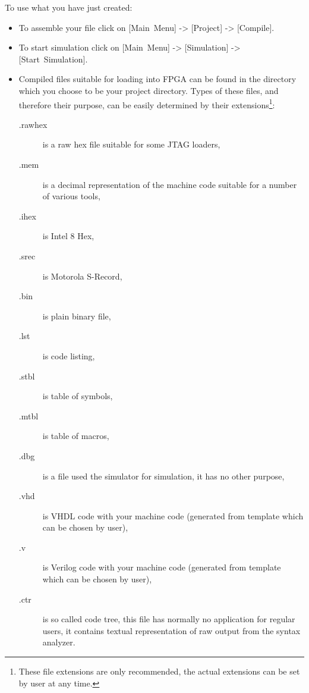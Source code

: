     To use what you have just created:
    \begin{itemize}
        \item To assemble your file click on [Main~Menu] -> [Project] -> [Compile].
        \item To start simulation click on [Main~Menu] -> [Simulation] -> [Start~Simulation].
        \item Compiled files suitable for loading into FPGA can be found in the directory which you choose to be your
              project directory. Types of these files, and therefore their purpose, can be easily determined by their
              extensions\footnote{These file extensions are only recommended, the actual extensions can be set by user
              at any time.}:
            \begin{description}
                \item [.rawhex] is a raw hex file suitable for some JTAG loaders,
                \item [.mem] is a decimal representation of the machine code suitable for a number of various tools,
                \item [.ihex] is Intel 8 Hex,
                \item [.srec] is Motorola S-Record,
                \item [.bin] is plain binary file,
                \item [.lst] is code listing,
                \item [.stbl] is table of symbols,
                \item [.mtbl] is table of macros,
                \item [.dbg] is a file used the simulator for simulation, it has no other purpose,
                \item [.vhd] is VHDL code with your machine code (generated from template which can be chosen by user),
                \item [.v] is Verilog code with your machine code (generated from template which can be chosen by user),
                \item [.ctr] is so called code tree, this file has normally no application for regular users, it
                      contains textual representation of raw output from the syntax analyzer.
            \end{description}
    \end{itemize}

